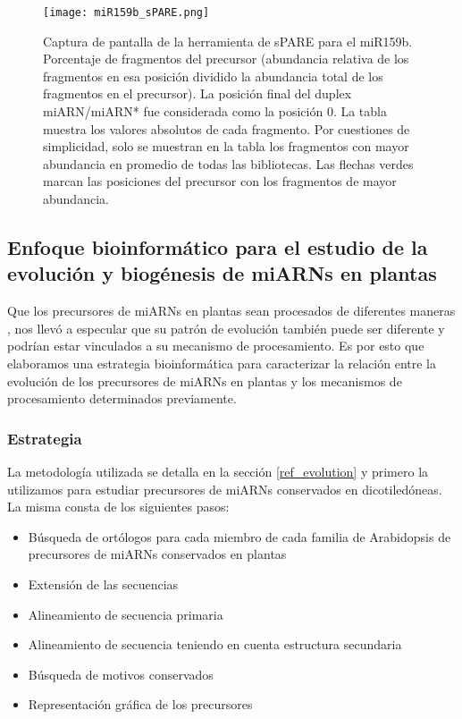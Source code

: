\begin{landscape}
    \begin{figure}[htbp!] 
        \centering    
        \texttt{[image: miR159b\_sPARE.png]}
		\caption[Captura de pantalla de la herramienta de sPARE para el miR159b]{Captura de pantalla de la herramienta de sPARE para el miR159b.
        Porcentaje de fragmentos del precursor (abundancia relativa de los fragmentos en esa posición dividido la abundancia total de los fragmentos en el precursor).
        La posición final del duplex miARN/miARN* fue considerada como la posición 0.
        La tabla muestra los valores absolutos de cada fragmento.
        Por cuestiones de simplicidad, solo se muestran en la tabla los fragmentos con mayor abundancia en promedio de todas las bibliotecas.
        Las flechas verdes marcan las posiciones del precursor con los fragmentos de mayor abundancia.
        }
		\label{fig:miR159b_sPARE}
    \end{figure}
\end{landscape}



\subsection{Enfoque bioinformático para el estudio de la evolución y biogénesis de miARNs en plantas}

Que los precursores de miARNs en plantas sean procesados de diferentes maneras \citep{Bologna2013}, nos llevó a especular que su patrón de evolución también puede ser diferente y podrían estar vinculados a su mecanismo de procesamiento.
Es por esto que elaboramos una estrategia bioinformática para caracterizar la relación entre la evolución de los precursores de miARNs en plantas y los mecanismos de procesamiento determinados previamente.

\subsubsection{Estrategia}

La metodología utilizada se detalla en la sección \ref{ref_evolution} y primero la utilizamos para estudiar precursores de miARNs conservados en dicotiledóneas. 
La misma consta de los siguientes pasos:

\begin{itemize}
    \item Búsqueda de ortólogos para cada miembro de cada familia de Arabidopsis de  precursores de miARNs conservados en plantas
    \item Extensión de las secuencias
    \item Alineamiento de secuencia primaria
    \item Alineamiento de secuencia teniendo en cuenta estructura secundaria
    \item Búsqueda de motivos conservados
    \item Representación gráfica de los precursores
\end{itemize}

